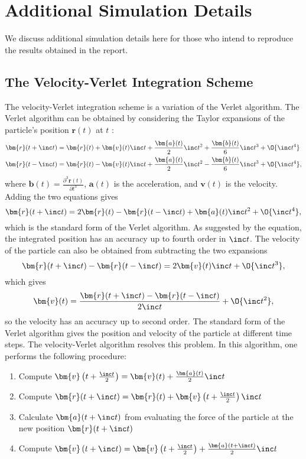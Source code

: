 \section{Additional Simulation Details}
We discuss additional simulation details here for those who intend to reproduce the results obtained in the report.

\subsection{The Velocity-Verlet Integration Scheme}
\label{app:velocity-verlet}
The velocity-Verlet integration scheme is a variation of the Verlet algorithm. The Verlet algorithm can be obtained by considering the Taylor expansions of the particle's position $\bm{r}(t)$ at $t$ :
\begin{align}
\bm{r}(t + \inc t) & = \bm{r}(t) + \bm{v}(t) \inc t + \frac{\bm{a}(t) }{2}\inc t^2 + \frac{\bm{b}(t) }{6}\inc t^3 + \O{\inc t^4}\\
\bm{r}(t - \inc t) & =  \bm{r}(t) - \bm{v}(t) \inc t  + \frac{\bm{a}(t)}{2} \inc t^2 - \frac{\bm{b}(t) }{6}\inc t^3 + \O{\inc t^4},
\end{align}
where $\bm{b}(t) = \frac{\partial^3\bm{r}(t)}{\partial t^3}$, $\bm{a}(t)$ is the acceleration, and $\bm{v}(t)$ is the velocity. Adding the two equations gives
\begin{equation}
\bm{r}(t+\inc t)  = 2\bm{r}(t) - \bm{r}(t-\inc t) + \bm{a}(t)\inc t^2 + \O{\inc t^4},
\end{equation}
which is the standard form of the Verlet algorithm. As suggested by the equation, the integrated position has an accuracy up to fourth order in $\inc t$. The velocity of the particle can also be obtained from subtracting the two expansions
\begin{equation}
\bm{r}(t+\inc t) - \bm{r}(t - \inc t) = 2\bm{v}(t)\inc t + \O{\inc t^3},
\end{equation}
which gives
\begin{equation}
\bm{v}(t) = \frac{\bm{r}(t+\inc t) - \bm{r}(t - \inc t)}{2\inc t} + \O{\inc t^2},
\end{equation}
so the velocity has an accuracy up to second order. The standard form of the Verlet algorithm gives the position and velocity of the particle at different time steps. The velocity-Verlet algorithm resolves this problem. In this algorithm, one performs the following procedure:
\begin{enumerate}
\item Compute $\bm{v}\left(t + \frac{\inc t}{2}\right) = \bm{v}(t) + \frac{\bm{a}(t)}{2} \inc t$
\item Compute $\bm{r}(t + \inc t) = \bm{r}(t) + \bm{v}\left(t + \frac{\inc t}{2}\right)\inc t$
\item Calculate $\bm{a}(t + \inc t)$ from evaluating the force of the particle at the new position $\bm{r}(t + \inc t)$
\item Compute $\bm{v}\left(t + \inc t\right) = \bm{v}\left(t + \frac{\inc t}{2}\right) + \frac{\bm{a}(t + \inc t)}{2} \inc t$
\end{enumerate}
